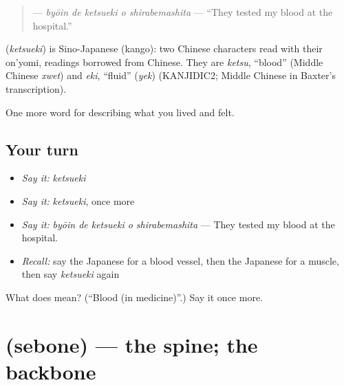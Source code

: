 \begin{quote}
\textbf{  } — \emph{byōin de ketsueki o shirabemashita} — \textquotedblleft{}They tested my blood at the hospital.\textquotedblright{}
\end{quote}

\begin{cousinweb}
\textbf{} (\emph{ketsueki}) is Sino-Japanese (kango): two Chinese characters read with their on'yomi, readings borrowed from Chinese. They are \emph{ketsu}, \textquotedblleft{}blood\textquotedblright{} (Middle Chinese \emph{xwet}) and \emph{eki}, \textquotedblleft{}fluid\textquotedblright{} (\emph{yek}) (KANJIDIC2; Middle Chinese in Baxter's transcription).
\end{cousinweb}

\begin{grammarlens}[title={What you've built}]
One more word for describing what you lived and felt.
\end{grammarlens}

\subsection*{Your turn}
\begin{itemize}
\raggedright
  \item \emph{Say it:} \emph{ketsueki}
  \item \emph{Say it:} \emph{ketsueki}, once more
  \item \emph{Say it:} \emph{byōin de ketsueki o shirabemashita} — They tested my blood at the hospital.
  \item \emph{Recall:} say the Japanese for a blood vessel, then the Japanese for a muscle, then say \emph{ketsueki} again
\end{itemize}

\begin{tcolorbox}[breakable,colback=teal!4,colframe=teal!35!black,title={Before you move on}]
What does  mean? (\textquotedblleft{}Blood (in medicine)\textquotedblright{}.) Say it once more.
\end{tcolorbox}
\section[\texorpdfstring{\ja{せぼね} (sebone)}{せぼね (sebone)}]{ (sebone) — the spine; the backbone}

\label{lesson:JA-C442-sebone}



